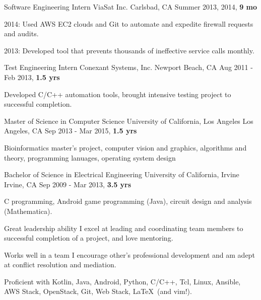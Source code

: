 \documentclass[11pt, a4paper]{awesome-cv}
\begin{document}
\begin{cventries}
	\cventry
	{Software Engineering Intern} %
	{ViaSat Inc.} %
	{Carlsbad, CA} %
	{Summer 2013, 2014, \textbf{9 mo}} %
	{
		\begin{cvitems} %
			\item {2014: Used AWS EC2 clouds and Git to automate and expedite firewall requests and audits.}
			\item {2013: Developed tool that prevents thousands of ineffective service calls monthly.}
		\end{cvitems}
	}
	
	\cventry
	{Test Engineering Intern} %
	{Conexant Systems, Inc.} %
	{Newport Beach, CA} %
	{Aug 2011 - Feb 2013, \textbf{1.5 yrs}} %
	{
		\begin{cvitems} %
			\item {Developed C/C++ automation tools, brought intensive testing project to successful completion.}
		\end{cvitems}
	}
\end{cventries}

\begin{cventries}
	\cventry
	{Master of Science in Computer Science} %
	{University of California, Los Angeles} %
	{Los Angeles, CA} %
	{Sep 2013 - Mar 2015, \textbf{1.5 yrs}} %
	{
		\begin{cvitems} %
			\item {Bioinformatics master's project, computer vision and graphics, algorithms and theory, programming lanuages, operating system design}
		\end{cvitems}
	}
	
	\cventry
	{Bachelor of Science in Electrical Engineering} %
	{University of California, Irvine} %
	{Irvine, CA} %
	{Sep 2009 - Mar 2013, \textbf{3.5 yrs}} %
	{
		\begin{cvitems} %
			\item {C programming, Android game programming (Java), circuit design and analysis (Mathematica).}
		\end{cvitems}
	}
\end{cventries}

\begin{cvskills}
	\cvskill
	{Great leadership ability}
	{I excel at leading and coordinating team members to successful completion of a project, and love mentoring.}
	
	\cvskill
	{Works well in a team}
	{I encourage other's professional development and am adept at conflict resolution and mediation.}

	\cvskill
	{Proficient with}
	{Kotlin, Java, Android, Python, C/C++, Tcl, Linux, Ansible, AWS Stack, OpenStack, Git, Web Stack, {\fontfamily{}\selectfont \LaTeX}\ (and vim!).}
\end{cvskills}
\end{document}
